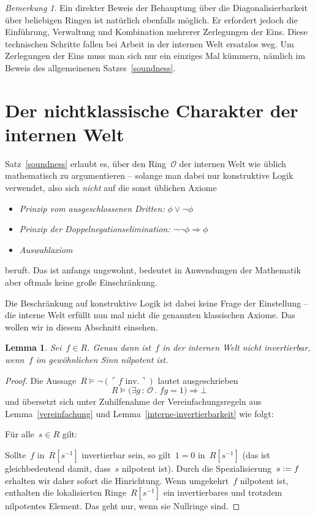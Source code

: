 \documentclass[a4paper,ngerman,12pt]{scrartcl}
\theoremstyle{definition}
\theoremstyle{plain}
\newtheorem{lemma}[defn]{Lemma}
\theoremstyle{remark}
\newtheorem{bem}[defn]{Bemerkung}
\renewcommand{\O}{\mathcal{O}}
\renewcommand{\_}{\mathpunct{.}\,}
\newcommand{\?}{\,{:}\,}
\newcommand{\defeq}{\vcentcolon=}
\newcommand{\speak}[1]{\ulcorner\text{#1}\urcorner}
\newenvironment{indentblock}{%
  \list{}{\leftmargin\leftmargin}%
  \item\relax
}{%
  \endlist
}
\begin{document}
\begin{bem}Ein direkter Beweis der Behauptung über die Diagonalisierbarkeit
über beliebigen Ringen ist natürlich ebenfalls möglich. Er erfordert jedoch
die Einführung, Verwaltung und Kombination mehrerer Zerlegungen der Eins. Diese
technischen Schritte fallen bei Arbeit in der internen Welt ersatzlos weg. Um
Zerlegungen der Eins muss man sich nur ein einziges Mal kümmern, nämlich im
Beweis des allgemeinenen Satzes~\ref{soundness}.\end{bem}


\section{Der nichtklassische Charakter der internen Welt}

Satz~\ref{soundness} erlaubt es, über den Ring~$\O$ der internen Welt
wie üblich mathematisch zu argumentieren -- solange man dabei nur konstruktive
Logik verwendet, also sich \emph{nicht} auf die sonst üblichen Axiome
\begin{itemize}
\item \emph{Prinzip vom ausgeschlossenen Dritten:} $\phi \vee \neg\phi$
\item \emph{Prinzip der Doppelnegationselimination:} $\neg\neg\phi \Rightarrow
\phi$
\item \emph{Auswahlaxiom}
\end{itemize}
beruft. Das ist anfangs ungewohnt, bedeutet in Anwendungen der Mathematik aber
oftmals keine große Einschränkung.

Die Beschränkung auf konstruktive Logik ist dabei keine Frage der Einstellung
-- die interne Welt erfüllt nun mal nicht die genannten klassischen Axiome. Das
wollen wir in diesem Abschnitt einsehen.

\begin{lemma}Sei~$f \in R$. Genau dann ist~$f$ in der internen Welt nicht
invertierbar, wenn~$f$ im gewöhnlichen Sinn nilpotent ist.\end{lemma}
\begin{proof}Die Aussage~$R \models \neg(\speak{$f$ inv.})$ lautet ausgeschrieben
\[ R \models \bigl(\exists g\?\O\_ fg = 1\bigr) \Rightarrow \bot \]
und übersetzt sich unter Zuhilfenahme der Vereinfachungsregeln aus Lemma~\ref{vereinfachung}
und Lemma~\ref{interne-invertierbarkeit} wie folgt:
\begin{indentblock}
Für alle~$s \in R$ gilt:
\begin{indentblock}
Sollte~$f$ in~$R[s^{-1}]$ invertierbar sein, so gilt~$1 = 0$ in~$R[s^{-1}]$
(das ist gleichbedeutend damit, dass~$s$ nilpotent ist).
\end{indentblock}
\end{indentblock}
Durch die Spezialisierung~$s \defeq f$ erhalten wir daher sofort die Hinrichtung.
Wenn umgekehrt~$f$ nilpotent ist, enthalten die lokalisierten Ringe~$R[s^{-1}]$
ein invertierbares und trotzdem nilpotentes Element. Das geht nur, wenn sie
Nullringe sind.
\end{proof}
\end{document}
